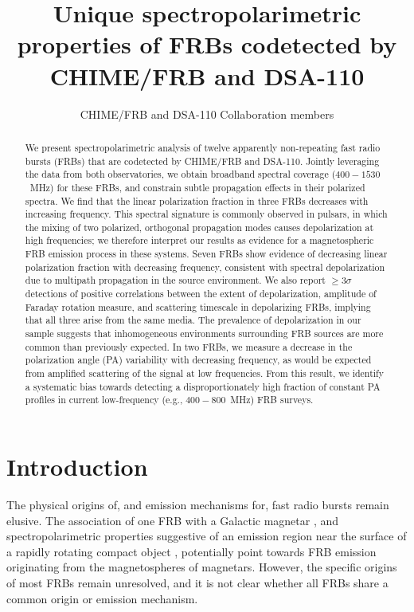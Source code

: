 \documentclass[twocolumn, linenumbers]{aastex701}
\begin{document}
\title{Unique spectropolarimetric properties of FRBs codetected by CHIME/FRB and DSA-110}

\author{CHIME/FRB and DSA-110 Collaboration members}
\affiliation{ }
\email{ }


\begin{abstract}
We present spectropolarimetric analysis of twelve apparently non-repeating fast radio bursts (FRBs) that are codetected by CHIME/FRB and DSA-110. Jointly leveraging the data from both observatories, we obtain broadband spectral coverage ($400-1530$~MHz) for these FRBs, and constrain subtle propagation effects in their polarized spectra. We find that the linear polarization fraction in three FRBs decreases with increasing frequency. This spectral signature is commonly observed in pulsars, in which the mixing of two polarized, orthogonal propagation modes causes depolarization at high frequencies; we therefore interpret our results as evidence for a magnetospheric FRB emission process in these systems. Seven FRBs show evidence of decreasing linear polarization fraction with decreasing frequency, consistent with spectral depolarization due to multipath propagation in the source environment. We also report $\geq3\sigma$ detections of positive correlations between the extent of depolarization, amplitude of Faraday rotation measure, and scattering timescale in depolarizing FRBs, implying that all three arise from the same media. The prevalence of depolarization in our sample suggests that inhomogeneous environments surrounding FRB sources are more common than previously expected. In two FRBs, we measure a decrease in the polarization angle (PA) variability with decreasing frequency, as would be expected from amplified scattering of the signal at low frequencies. From this result, we identify a systematic bias towards detecting a disproportionately high fraction of constant PA profiles in current low-frequency (e.g., $400-800$~MHz) FRB surveys.
\end{abstract}



\section{Introduction} \label{sec:intro}
The physical origins of, and emission mechanisms for, fast radio bursts \citep[FRBs; micro- to millisecond duration, coherent radio transients, mostly from extragalactic distances][]{2007Sci...318..777L} remain elusive. The association of one FRB with a Galactic magnetar \citep[FRB~200428;][]{2020Natur.587...54C, 2020Natur.587...59B}, and spectropolarimetric properties suggestive of an emission region near the surface of a rapidly rotating compact object \citep[FRB~20221022A;][]{2025Natur.637...43M, 2025Natur.637...48N}, potentially point towards FRB emission originating from the magnetospheres of magnetars. However, the specific origins of most FRBs \citep[i.e., over 4500;][]{FRBCollaboration_2026_arXiv} remain unresolved, and it is not clear whether all FRBs share a common origin or emission mechanism.
\end{document}
